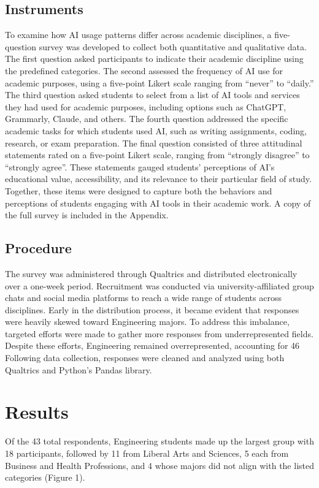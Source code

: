 \documentclass[12pt]{article}
\begin{document}
\subsection{Instruments}
\label{subsec:instruments}
To examine how AI usage patterns differ across academic disciplines, a five-question survey was developed to collect both quantitative and qualitative data. The first question asked participants to indicate their academic discipline using the predefined categories. The second assessed the frequency of AI use for academic purposes, using a five-point Likert scale ranging from “never” to “daily.”
The third question asked students to select from a list of AI tools and services they had used for academic purposes, including options such as ChatGPT, Grammarly, Claude, and others. The fourth question addressed the specific academic tasks for which students used AI, such as writing assignments, coding, research, or exam preparation.
The final question consisted of three attitudinal statements rated on a five-point Likert scale, ranging from “strongly disagree” to “strongly agree”. These statements gauged students’ perceptions of AI’s educational value, accessibility, and its relevance to their particular field of study.
Together, these items were designed to capture both the behaviors and perceptions of students engaging with AI tools in their academic work. A copy of the full survey is included in the Appendix.


\subsection{Procedure}
\label{subsec:procedure}
The survey was administered through Qualtrics and distributed electronically over a one-week period. Recruitment was conducted via university-affiliated group chats and social media platforms to reach a wide range of students across disciplines.
Early in the distribution process, it became evident that responses were heavily skewed toward Engineering majors. To address this imbalance, targeted efforts were made to gather more responses from underrepresented fields. Despite these efforts, Engineering remained overrepresented, accounting for 46%
Following data collection, responses were cleaned and analyzed using both Qualtrics and Python’s Pandas library.




\section{Results}
Of the 43 total respondents, Engineering students made up the largest group with 18 participants, followed by 11 from Liberal Arts and Sciences, 5 each from Business and Health Professions, and 4 whose majors did not align with the listed categories (Figure 1).
\end{document}

